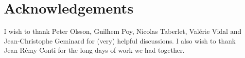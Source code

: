 \documentclass[class=report, float=false, crop=false]{standalone}
\begin{document}
\section*{Acknowledgements}
\label{conclusion}

I wish to thank Peter Olsson, Guilhem Poy, Nicolas Taberlet, Valérie Vidal and Jean-Christophe Geminard for (very) helpful discussions. I also wish to thank Jean-Rémy Conti for the long days of work we had together.

% 
\end{document}
